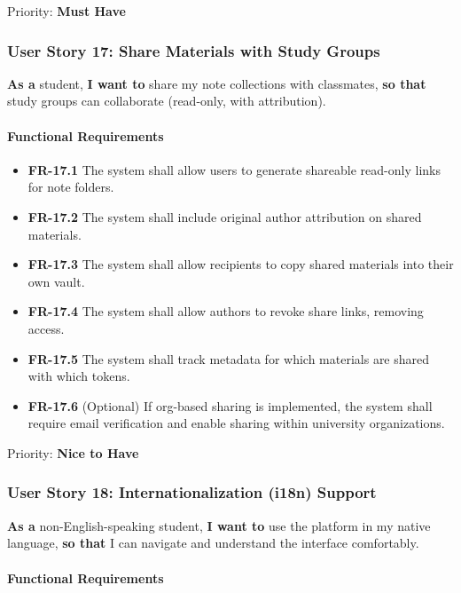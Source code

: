 \documentclass[12pt,a4paper]{article}
\begin{document}
Priority: \textbf{Must Have}

\subsubsection{User Story 17: Share Materials with Study Groups}

\textbf{As a} student, \textbf{I want to} share my note collections with classmates, \textbf{so that} study groups can collaborate (read-only, with attribution).

\paragraph{Functional Requirements}

\begin{itemize}
    \item \textbf{FR-17.1} The system shall allow users to generate shareable read-only links for note folders.
    \item \textbf{FR-17.2} The system shall include original author attribution on shared materials.
    \item \textbf{FR-17.3} The system shall allow recipients to copy shared materials into their own vault.
    \item \textbf{FR-17.4} The system shall allow authors to revoke share links, removing access.
    \item \textbf{FR-17.5} The system shall track metadata for which materials are shared with which tokens.
    \item \textbf{FR-17.6} (Optional) If org-based sharing is implemented, the system shall require email verification and enable sharing within university organizations.
\end{itemize}

Priority: \textbf{Nice to Have}

\subsubsection{User Story 18: Internationalization (i18n) Support}

\textbf{As a} non-English-speaking student, \textbf{I want to} use the platform in my native language, \textbf{so that} I can navigate and understand the interface comfortably.

\paragraph{Functional Requirements}
\end{document}
